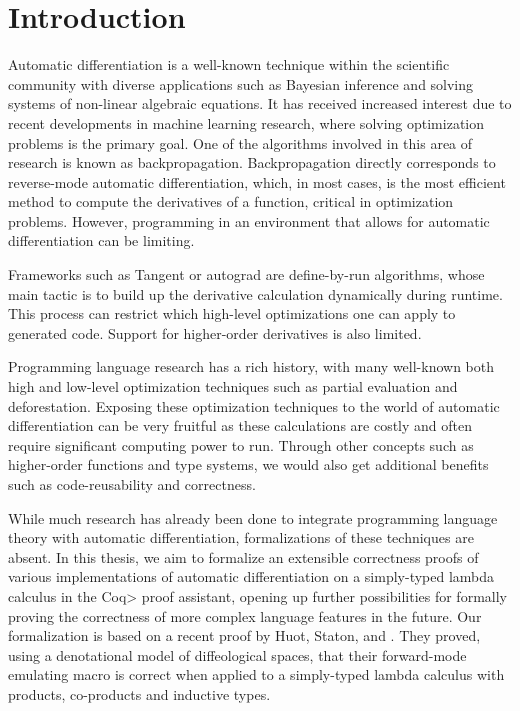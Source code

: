 \section{Introduction}
Automatic differentiation is a well-known technique within the scientific community with diverse applications such as Bayesian inference and solving systems of non-linear algebraic equations.
It has received increased interest due to recent developments in machine learning research, where solving optimization problems is the primary goal.
One of the algorithms involved in this area of research is known as backpropagation.
Backpropagation directly corresponds to reverse-mode automatic differentiation, which, in most cases, is the most efficient method to compute the derivatives of a function, critical in optimization problems.
However, programming in an environment that allows for automatic differentiation can be limiting.

Frameworks such as Tangent or autograd are define-by-run algorithms, whose main tactic is to build up the derivative calculation dynamically during runtime.
This process can restrict which high-level optimizations one can apply to generated code.
Support for higher-order derivatives is also limited.

Programming language research has a rich history, with many well-known both high and low-level optimization techniques such as partial evaluation and deforestation.
Exposing these optimization techniques to the world of automatic differentiation can be very fruitful as these calculations are costly and often require significant computing power to run.
Through other concepts such as higher-order functions and type systems, we would also get additional benefits such as code-reusability and correctness.

While much research has already been done to integrate programming language theory with automatic differentiation, formalizations of these techniques are absent.
In this thesis, we aim to formalize an extensible correctness proofs of various implementations of automatic differentiation on a simply-typed lambda calculus in the \<Coq> proof assistant, opening up further possibilities for formally proving the correctness of more complex language features in the future.
Our formalization is based on a recent proof by Huot, Staton, and \Vakar{} \cite{huot2020correctness}.
They proved, using a denotational model of diffeological spaces, that their forward-mode emulating macro is correct when applied to a simply-typed lambda calculus with products, co-products and inductive types.

